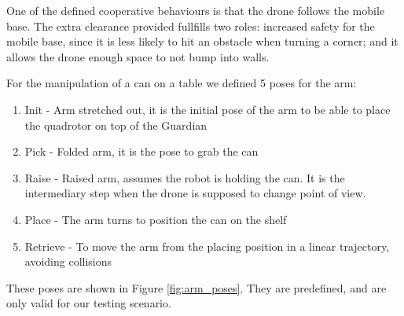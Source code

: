 \documentclass[11pt,a4paper]{article}
\begin{document}
One of the defined cooperative behaviours is that the drone follows the mobile base.  The extra clearance provided fullfills two roles: increased safety for the mobile base, since it is less likely to hit an obstacle when turning a corner; and it allows the drone enough space to not bump into walls. 

\vspace{10mm}

For the manipulation of a can on a table we defined 5 poses for the arm:
\begin{enumerate}
	\item Init - Arm stretched out, it is the initial pose of the arm to be able to place the quadrotor on 
		top of the Guardian
	\item Pick - Folded arm, it is the pose to grab the can
	\item Raise - Raised arm, assumes the robot is holding the can. It is the intermediary step when the drone is supposed to change point of view.
	\item Place - The arm turns to position the can on the shelf
	\item Retrieve - To move the arm from the placing position in a linear trajectory, avoiding collisions
\end{enumerate}

 These poses are shown in Figure \ref{fig:arm_poses}. They are predefined, and are only valid for our testing scenario. 
\end{document}
